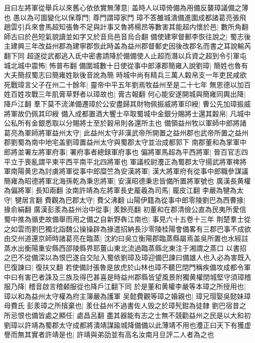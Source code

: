 且曰左將軍從舉兵以來舊心依依實無薄意|{
	盖時人以璋倚備為用備反襲璋議備之薄也}
愚以為可圖變化以保尊門|{
	尊門謂璋家門}
璋不答雒城潰備進圍成都諸葛亮張飛趙雲引兵來會馬超知張魯不足與計事又魯將楊昂等數害其能超内懷於邑|{
	數所角翻師古曰於邑短氣貌讀並如字又於音烏邑音烏合翻}
備使建寧督郵李恢往說之|{
	蜀志後主建興三年改益州郡為建寧郡恢此時盖為益州郡督郵史因後改郡名而書之耳說輸芮翻下同}
超遂從武都逃入氐中密書請降於備備使人止超而潛以兵資之超到令引軍屯城北城中震怖|{
	怖普布翻}
備圍城數十日使從事中郎涿郡簡雍入說劉璋|{
	簡姓也魯有大夫簡叔蜀志曰簡雍姓耿後音訛為簡}
時城中尚有精兵三萬人糓帛支一年吏民咸欲死戰璋言父子在州二十餘年|{
	靈帝中平五年劉焉牧益州至是二十七年}
無恩德以加百姓百姓攻戰三年肌膏草野者以璋故也|{
	膏古報翻}
何心能安遂開城與簡雍同輿出降|{
	降戶江翻}
羣下莫不流涕備遷璋於公安盡歸其財物佩振威將軍印綬|{
	曹公先加璋振威將軍故仍佩其印綬}
備入成都置酒大饗士卒取蜀城中金銀分賜將士還其糓帛|{
	凡城中公私所有金銀悉取以分賜將士至於穀帛則各還所主也}
備領益州牧以軍師中郎將諸葛亮為軍師將軍益州太守|{
	此益州太守非漢武帝所開置之益州郡也武帝所置之益州郡劉蜀為南中地宅盖劉璋置益州太守與蜀郡太守並治成都郭下}
南郡董和為掌軍中郎將並署左將軍府事|{
	署府事者總録軍府事也}
偏將軍馬超為平西將軍|{
	晉百官志四平立于喪亂謂平柬平西平南平北四將軍也}
軍議校尉灋正為蜀郡太守揚武將軍禆將軍南陽黄忠為討虜將軍從事中郎糜竺為安漢將軍|{
	漢大將軍府有從事中郎職參謀議}
簡雍為昭德將軍北海孫乾為秉忠將軍|{
	安漢昭德秉忠皆備所置將軍號也}
廣漢長黄權為偏將軍|{
	長知兩翻}
汝南許靖為左將軍長史龎羲為司馬|{
	龎皮江翻}
李嚴為犍為太守|{
	犍居言翻}
費觀為巴郡太守|{
	費父沸翻}
山陽伊籍為從事中郎零陵劉巴為西曹掾|{
	掾俞絹翻}
廣漢彭羕為益州治中從事|{
	羕餘亮翻}
初董和在郡清儉公直為民夷所愛信蜀中推為循吏故備舉而用之備之自新野犇江南也|{
	事見六十五卷十三年}
荆楚羣士從之如雲而劉巴獨北詣魏公操操辟為掾遣招納長沙零陵桂陽會備畧有三郡巴事不成欲由交州道還京師時諸葛亮在臨蒸|{
	沈約曰吳立衡陽郡臨蒸縣屬焉盖吳所置也水經註蒸水出衡陽重安縣西邵陵縣界耶薑山東北流過臨蒸縣北東注于湘謂之蒸口}
以書招之巴不從備深以為恨巴遂自交阯入蜀依劉璋及璋迎備巴諫曰備雄人也入必為害既入巴復諫曰|{
	復扶又翻}
若使備討張魯是放虎於山林也璋不聽巴閉門稱疾備攻成都令軍中曰有害巴者誅及三族及得巴甚喜是時益州郡縣皆望風景附獨黄權閉城堅守須璋稽服乃降|{
	稽音啟言稽顙服從也降戶江翻下同}
於是董和黄權李嚴等本璋之所授用也|{
	璋以和為益州太守權為府主簿嚴為護軍}
吴懿費觀等璋之婚親也|{
	璋兄瑁娶吳懿妹璋母費氏}
彭羕璋之所擯棄也|{
	羕仕益州不過書佐人毁之於璋髠鉗為徒隸}
劉巴宿昔之所忌恨也備皆處之顯任|{
	處昌呂翻}
盡其器能有志之士無不競勸益州之民是以大和初劉璋以許靖為蜀郡太守成都將潰靖謀踰城降備備以此薄靖不用也灋正曰天下有獲虚譽而無其實者許靖是也|{
	許靖與弟劭並有高名汝南月旦評二人者為之也}
